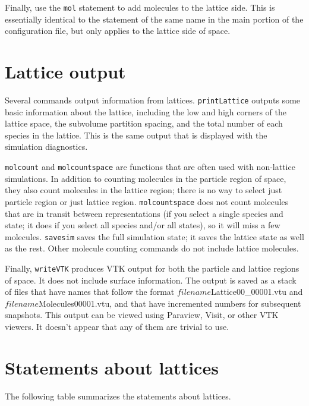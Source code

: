 \documentclass {scrbook}
\newcommand {\ttt} {\texttt}
\begin{document}
Finally, use the \ttt{mol} statement to add molecules to the lattice side. This is essentially identical to the statement of the same name in the main portion of the configuration file, but only applies to the lattice side of space.

\section{Lattice output}

Several commands output information from lattices. \ttt{printLattice} outputs some basic information about the lattice, including the low and high corners of the lattice space, the subvolume partition spacing, and the total number of each species in the lattice. This is the same output that is displayed with the simulation diagnostics.

\ttt{molcount} and \ttt{molcountspace} are functions that are often used with non-lattice simulations. In addition to counting molecules in the particle region of space, they also count molecules in the lattice region; there is no way to select just particle region or just lattice region. \ttt{molcountspace} does not count molecules that are in transit between representations (if you select a single species and state; it does if you select all species and/or all states), so it will miss a few molecules. \ttt{savesim} saves the full simulation state; it saves the lattice state as well as the rest. Other molecule counting commands do not include lattice molecules.

Finally, \ttt{writeVTK} produces VTK output for both the particle and lattice regions of space. It does not include surface information. The output is saved as a stack of files that have names that follow the format $filename$Lattice00\_00001.vtu and $filename$Molecules00001.vtu, and that have incremented numbers for subsequent snapshots. This output can be viewed using Paraview, Visit, or other VTK viewers. It doesn't appear that any of them are trivial to use.

\section{Statements about lattices}

The following table summarizes the statements about lattices.
\end{document}
